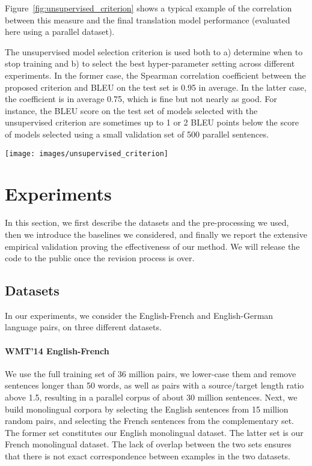 \documentclass{article} \usepackage{iclr2018_conference,times}
\begin{document}
Figure~\ref{fig:unsupervised_criterion} shows a typical example of the correlation between this measure and the final translation model performance (evaluated here using a parallel dataset).

The unsupervised model selection criterion is used both to a) determine when to stop training and b) to select the best hyper-parameter setting across different experiments. In the former case, the Spearman correlation coefficient between the proposed criterion and BLEU on the test set is 0.95 in average. In the latter case, the coefficient is in average 0.75, which is fine but not nearly as good. For instance, the BLEU score on the test set of models selected with the unsupervised criterion are sometimes up to 1 or 2 BLEU points below the score of models selected using a small validation set of 500 parallel sentences.


\begin{SCfigure}\centering
   \texttt{[image: images/unsupervised\_criterion]}
   \caption{\textbf{Unsupervised model selection.} BLEU score of the source to target and target to source models on the Multi30k-Task1 English-French dataset as a function of the number of passes through the dataset at iteration  of the algorithm (training  given ). BLEU correlates very well with the proposed model selection criterion, see Equation~\ref{eq:ms}.\label{fig:unsupervised_criterion}}
\end{SCfigure}

 \section{Experiments}
\label{sec:experiments}
In this section, we first describe the datasets and the pre-processing we used, then we introduce the baselines we considered, and finally we report the extensive empirical validation proving the effectiveness of our method. We will release the code to the public once the revision process is over. 
\subsection{Datasets}

In our experiments, we consider the English-French and English-German language pairs, on three different datasets.

\paragraph{WMT'14 English-French} We use the full training set of 36 million pairs, we lower-case them and remove sentences longer than 50 words, as well as pairs with a source/target length ratio above 1.5, resulting in a parallel corpus of about 30 million sentences. Next, we build monolingual corpora by selecting the English sentences from 15 million random pairs, and selecting the French sentences from the complementary set. The former set constitutes our English monolingual dataset. The latter set is our French monolingual dataset. The lack of overlap between the two sets ensures that there is not exact correspondence between examples in the two datasets.
\end{document}
